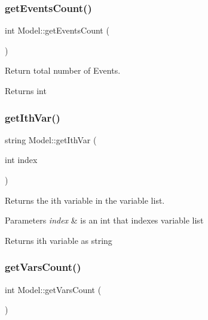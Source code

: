 \subsubsection{\texorpdfstring{get\+Events\+Count()}{getEventsCount()}}
{\footnotesize\ttfamily int Model\+::get\+Events\+Count (\begin{DoxyParamCaption}{ }\end{DoxyParamCaption})}



Return total number of Events. 

\begin{DoxyReturn}{Returns}
int 
\end{DoxyReturn}
\mbox{\label{class_model_adcb9dcc2d1d58f18d595f1476fc77b3b}} 
\subsubsection{\texorpdfstring{get\+Ith\+Var()}{getIthVar()}}
{\footnotesize\ttfamily string Model\+::get\+Ith\+Var (\begin{DoxyParamCaption}\item[{int}]{index }\end{DoxyParamCaption})}



Returns the ith variable in the variable list. 


\begin{DoxyParams}{Parameters}
{\em index} & is an int that indexes variable list \\
\hline
\end{DoxyParams}
\begin{DoxyReturn}{Returns}
ith variable as string 
\end{DoxyReturn}
\mbox{\label{class_model_ae8b56a284c355ff18421174d078dc870}} 
\subsubsection{\texorpdfstring{get\+Vars\+Count()}{getVarsCount()}}
{\footnotesize\ttfamily int Model\+::get\+Vars\+Count (\begin{DoxyParamCaption}{ }\end{DoxyParamCaption})}



